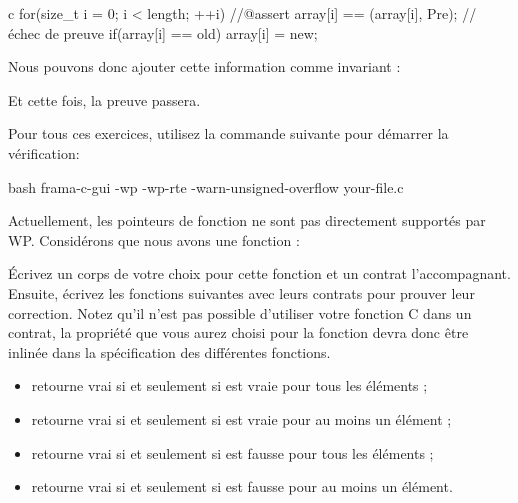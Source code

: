 \begin{CodeBlock}{c}
for(size_t i = 0; i < length; ++i){
    //@assert array[i] == \at(array[i], Pre); // échec de preuve
    if(array[i] == old) array[i] = new;
}
\end{CodeBlock}



Nous pouvons donc ajouter cette information comme invariant :






Et cette fois, la preuve passera. 





Pour tous ces exercices, utilisez la commande suivante pour démarrer la vérification:

\begin{CodeBlock}{bash}
frama-c-gui -wp -wp-rte -warn-unsigned-overflow your-file.c
\end{CodeBlock}  




Actuellement, les pointeurs de fonction ne sont pas directement supportés par WP.
Considérons que nous avons une fonction :





Écrivez un corps de votre choix pour cette fonction et un contrat l'accompagnant.
Ensuite, écrivez les fonctions suivantes avec leurs contrats pour prouver leur
correction. Notez qu'il n'est pas possible d'utiliser votre fonction C dans un
contrat, la propriété que vous aurez choisi pour la fonction 
devra donc être inlinée dans la spécification des différentes fonctions.

\begin{itemize}
\item {} retourne vrai si et seulement si 
  est vraie pour tous les éléments ;
\item {} retourne vrai si et seulement si 
  est vraie pour au moins un élément ;
\item {} retourne vrai si et seulement si 
  est fausse pour tous les éléments ;
\item {} retourne vrai si et seulement si 
  est fausse pour au moins un élément.
\end{itemize}

